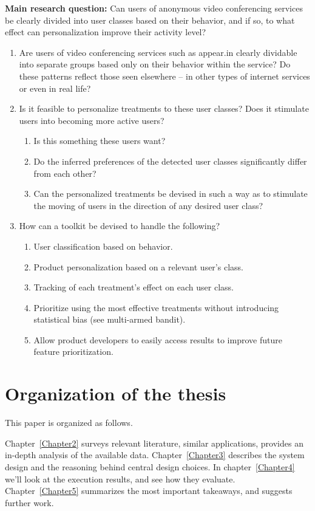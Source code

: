 \textbf{Main research question:} Can users of anonymous video conferencing services be clearly divided into user classes based on their behavior, and if so, to what effect can personalization improve their activity level?

\begin{enumerate}
  \item Are users of video conferencing services such as appear.in clearly dividable into separate groups based only on their behavior within the service? Do these patterns reflect those seen elsewhere -- in other types of internet services or even in real life?
  \item Is it feasible to personalize treatments to these user classes? Does it stimulate users into becoming more active users?
  \begin{enumerate}
    \item Is this something these users want?
    \item Do the inferred preferences of the detected user classes significantly differ from each other?
    \item Can the personalized treatments be devised in such a way as to stimulate the moving of users in the direction of any desired user class?
  \end{enumerate}
  \item How can a toolkit be devised to handle the following?
  \begin{enumerate}
    \item User classification based on behavior.
    \item Product personalization based on a relevant user's class.
    \item Tracking of each treatment's effect on each user class.
    \item Prioritize using the most effective treatments without introducing statistical bias (see multi-armed bandit).
    \item Allow product developers to easily access results to improve future feature prioritization.
  \end{enumerate}
\end{enumerate}

\section{Organization of the thesis}
\label{sec:thesis_organization}

This paper is organized as follows.

Chapter~\ref{Chapter2} surveys relevant literature, similar applications, provides an in-depth analysis of the available data.
Chapter~\ref{Chapter3} describes the system design and the reasoning behind central design choices.
In chapter~\ref{Chapter4} we'll look at the execution results, and see how they evaluate.
Chapter~\ref{Chapter5} summarizes the most important takeaways, and suggests further work.


